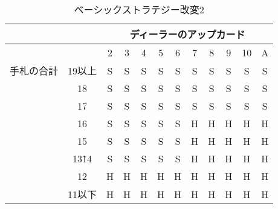 \begin{table}[htbp]
  \centering
  \caption{ベーシックストラテジー改変2\label{bschange2}}
  \begin{tabular}{|c|c|c|c|c|c|c|c|c|c|c|c|}
    \hline
    \multicolumn{2}{|c|}{} & \multicolumn{10}{|c|}{ディーラーのアップカード} \\ \hline
    \multicolumn{2}{|c|}{} & 2 & 3 & 4 & 5 & 6 & 7 & 8 & 9 & 10 & A \\ \hline
    手札の合計 & 19以上 & S & S & S & S & S & S & S & S & S & S \\ \cline{3-12}
              & 18 & S & S & S & S & S & S & S & S & S & S \\ \cline{3-12}
              & 17 & S & S & S & S & S & S & S & S & S & S \\ \cline{3-12}
              & 16 & S & S & S & S & S & H & H & H & H & H \\ \cline{3-12}
              & 15 & S & S & S & S & S & H & H & H & H & H \\ \cline{3-12}
              & 13\~ 14 & S & S & S & S & S & H & H & H & H & H \\ \cline{3-12}
              & 12 & H & H & H & H & H & H & H & H & H & H \\ \cline{3-12}
              & 11以下 & H & H & H & H & H & H & H & H & H & H \\ \hline
  \end{tabular}
\end{table}

